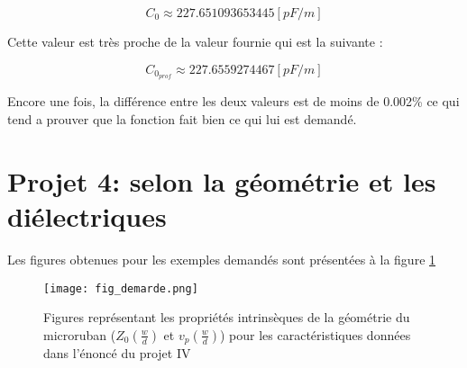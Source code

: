 \begin{equation}
	C_0 \approx 227.651093653445[pF/m]
\end{equation}

Cette valeur est très proche de la valeur fournie qui est la suivante :

\begin{equation}
	C_{0_{prof}} \approx 227.6559274467 [pF/m]
\end{equation}

Encore une fois, la différence entre les deux valeurs est de moins de 0.002\% ce qui tend a prouver que la fonction fait bien ce qui lui est demandé.

\section{Projet 4:  selon la géométrie et les diélectriques}

Les figures obtenues pour les exemples demandés sont présentées à la figure \ref{fig_marde}

\begin{figure}[htb]
\begin{center}
\texttt{[image: fig\_demarde.png]}
\label{fig_marde}
\caption{Figures représentant les propriétés intrinsèques de la géométrie du microruban ($Z_0 (\frac{w}{d})$ et $v_p(\frac{w}{d})$) pour les caractéristiques données dans l'énoncé du projet IV}
\end{center}
\end{figure}


